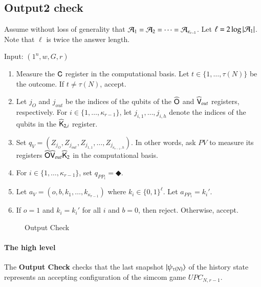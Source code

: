 \subsection{Output2 check}
\label{sec:output_check}


Assume without loss of generality that $\mathcal A_1 = \mathcal A_2 = \cdots = \mathcal A_{\kappa_{r-1}}$. Let $\ell = 2 \log |\mathcal A_1|$.  Note that $\ell$ is twice the answer length.

\vspace{10pt}
\begin{center}
\begin{mdframed}
    Input: $(1^n,w,G,r)$
    \begin{enumerate}
		\item Measure the ${\mathsf{C}}$ register in the computational basis. Let $t \in \{1,\ldots,\tau(N)\}$ be the outcome. If $t \neq \tau(N)$, accept.
		
		\item Let $j_O$ and $j_{out}$ be the indices of the qubits of the $\widehat{{\mathsf{O}}}$ and $\widehat{{\mathsf{V}}}_{out}$ registers, respectively. For $i \in \{1,\ldots,\kappa_{r-1}\}$, let $j_{i,1},\ldots,j_{i,h}$ denote the indices of the qubits in the $\widehat{{\mathsf{K}}}_{2,i}$ register. 
		\item Set $q_V = (Z_{j_O},Z_{j_{out}},Z_{j_{1,1}},\ldots,Z_{j_{\kappa_{r-1},h}})$. In other words, ask $PV$ to measure its registers $\widehat{{\mathsf{O}}} \widehat{{\mathsf{V}}}_{out} \widehat{{\mathsf{K}}}_2$ in the computational basis. 
		\item For $i \in \{1,\ldots,\kappa_{r-1}\}$, set $q_{PP_i} = \Diamondblack$. 
		\item Let $a_V = (o,b,k_1,\ldots,k_{\kappa_{r-1}})$ where $k_i \in \{0,1\}^{\ell}$. Let $a_{PP_i} = k_i'$. 
		\item If $o = 1$ and $k_i = k_i'$ for all $i$ and $b = 0$, then reject. Otherwise, accept.
	\end{enumerate}    
\end{mdframed}
\end{center}
\begin{figure}[H]
\caption{Output Check}
\label{fig:output_check}
\end{figure}


\paragraph{The high level} The \textbf{Output Check} checks that the last snapshot $|\psi_{\tau(N)}\rangle$ of the history state represents an accepting configuration of the simcom game $UPC_{N,r-1}$. 

